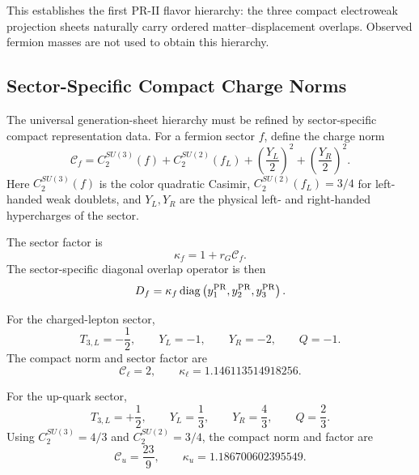 \documentclass[11pt]{article}
\begin{document}
This establishes the first PR-II flavor hierarchy: the three compact electroweak projection sheets naturally carry ordered matter--displacement overlaps. 
Observed fermion masses are not used to obtain this hierarchy.

\subsection{Sector-Specific Compact Charge Norms}
\label{sec:pr2_sector_specific_compact_charge_norms}

The universal generation-sheet hierarchy must be refined by sector-specific compact representation data. 
For a fermion sector \(f\), define the charge norm
\begin{equation}
\mathcal C_f
=
C_2^{SU(3)}(f)
+
C_2^{SU(2)}(f_L)
+
\left(
\frac{Y_L}{2}
\right)^2
+
\left(
\frac{Y_R}{2}
\right)^2.
\end{equation}
Here \(C_2^{SU(3)}(f)\) is the color quadratic Casimir, \(C_2^{SU(2)}(f_L)=3/4\) for left-handed weak doublets, and \(Y_L,Y_R\) are the physical left- and right-handed hypercharges of the sector.

The sector factor is
\begin{equation}
\kappa_f
=
1+r_G\mathcal C_f.
\end{equation}
The sector-specific diagonal overlap operator is then
\begin{equation}
D_f
=
\kappa_f
\operatorname{diag}
\left(
y_1^{\rm PR},
y_2^{\rm PR},
y_3^{\rm PR}
\right).
\end{equation}

For the charged-lepton sector,
\begin{equation}
\boxed{
T_{3,L}=-\frac12,
\qquad
Y_L=-1,
\qquad
Y_R=-2,
\qquad
Q=-1.
}
\end{equation}
The compact norm and sector factor are
\begin{equation}
\boxed{
\mathcal C_{\ell}=2,
\qquad
\kappa_{\ell}
=
1.146113514918256.
}
\end{equation}

For the up-quark sector,
\begin{equation}
\boxed{
T_{3,L}=+\frac12,
\qquad
Y_L=\frac13,
\qquad
Y_R=\frac43,
\qquad
Q=\frac23.
}
\end{equation}
Using \(C_2^{SU(3)}=4/3\) and \(C_2^{SU(2)}=3/4\), the compact norm and factor are
\begin{equation}
\boxed{
\mathcal C_u
=
\frac{23}{9},
\qquad
\kappa_u
=
1.186700602395549.
}
\end{equation}
\end{document}
